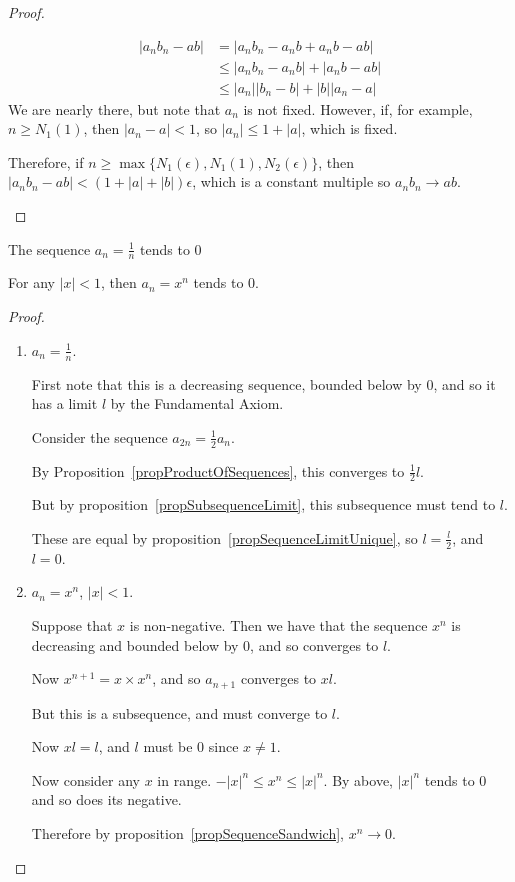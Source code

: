 \documentclass[../Main.tex]{subfiles}
\begin{document}
\begin{proof}
\begin{enumerate}
\begin{align*}
                |a_n b_n - ab| &= |a_n b_n - a_n b + a_n b - ab| \\
                &\leq |a_n b_n - a_n b| + |a_n b - ab| \\
                &\leq |a_n| |b_n - b| + |b| |a_n - a|
            \end{align*}
            We are nearly there, but note that $a_n$ is not fixed. However, if, for example, $n \geq N_1(1)$, then $|a_n - a| < 1$, so $|a_n| \leq 1 + |a|$, which is fixed.\par
            Therefore, if $n \geq \max{\{N_1(\epsilon), N_1(1), N_2(\epsilon)\}}$, then $|a_n b_n - ab| < (1 + |a| + |b|)\epsilon$, which is a constant multiple so $a_n b_n \rightarrow ab$.
    \end{enumerate}
\end{proof}
\begin{propositions}{
        \label{propSequenceLimits}
    }
    \item The sequence $a_n = \frac{1}{n}$ tends to 0 \label{propReciprocalLimit}
    \item For any $|x| < 1$, then $a_n = x^n$ tends to 0. \label{propPowersLimit}
\end{propositions}
\begin{proof}
    \begin{enumerate}
        \item $a_n = \frac{1}{n}$.\par
            First note that this is a decreasing sequence, bounded below by 0, and so it has a limit $l$ by the Fundamental Axiom.\par
            Consider the sequence $a_{2n} = \frac{1}{2} a_n$.\par
            By Proposition~\ref{propProductOfSequences}, this converges to $\frac{1}{2}l$.\par
            But by proposition~\ref{propSubsequenceLimit}, this subsequence must tend to $l$.\par
            These are equal by proposition~\ref{propSequenceLimitUnique}, so $l = \frac{l}{2}$, and $l = 0$.
        \item $a_n = x^n$, $|x| < 1$.\par
            Suppose that $x$ is non-negative. Then we have that the sequence $x^n$ is decreasing and bounded below by 0, and so converges to $l$.\par
            Now $x^{n+1} = x \times x^n$, and so $a_{n+1}$ converges to $x l$.\par
            But this is a subsequence, and must converge to $l$.\par
            Now $xl = l$, and $l$ must be 0 since $x \neq 1$.\par
            Now consider any $x$ in range. $-|x|^n \leq x^n \leq |x|^n$. By above, $|x|^n$ tends to 0 and so does its negative.\par
            Therefore by proposition~\ref{propSequenceSandwich}, $x^n \rightarrow 0$.
    \end{enumerate}
\end{proof}
\end{document}
